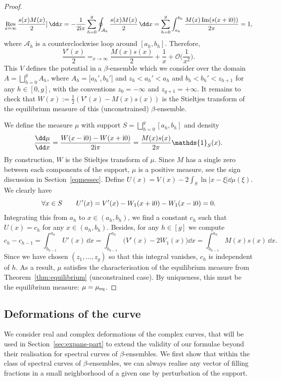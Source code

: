 \documentclass[10pt,a4paper]{amsart}
\numberwithin{equation}{section}
\newcommand{\ind}{\mathds{1}}
\begin{document}
\begin{proof}
\[
\mathop{\text{Res}}_{x = \infty} \frac{s(x)M(x)}{2}]\, \dd x = -\frac{1}{2{\rm i}\pi} \sum_{h = 0}^{g} \oint_{\mathcal{A}_h} \frac{s(x)M(x)}{2}\, \dd x = \sum_{h = 0}^{g} \int_{a_h}^{b_h} \frac{M(x) \operatorname{Im}(s(x + {\rm i}0))}{2\pi} = 1,
\]
where $\mathcal{A}_h$ is a counterclockwise loop around $[a_h,b_h]$. Therefore,
\[
\frac{V'(x)}{2} \mathop{\mathop{=}}_{x \rightarrow \infty} \frac{M(x)s(x)}{2} + \frac{1}{x} + \mathcal{O}\biggl(\frac{1}{x^2}\biggr).
\]
This $V$ defines the potential in a $\beta$-ensemble which we consider over the domain $A = \bigsqcup_{h = 0}^{g} A_h$, where $A_h = \bigl[a_h',b_h'\bigr]$ and $z_{h} < a_h' < a_h$ and $b_h < b_h' < z_{h + 1}$ for any $h \in [0,g]$, with the conventions $z_0 = -\infty$ and $z_{g + 1} = +\infty$. It remains to check that $W(x) := \frac{1}{2}(V'(x) - M(x)s(x))$ is the Stieltjes transform of the equilibrium measure of this (unconstrained) $\beta$-ensemble.



We define the measure $\mu$ with support $S = \bigsqcup_{h = 0}^{g} [a_h,b_h]$ and density
\[
\frac{\dd\mu}{\dd x} = \frac{W(x - {\rm i}0) - W(x + {\rm i}0)}{2{\rm i}\pi} = \frac{M(x)s(x)}{2\pi} \ind_S(x).
\]
By construction, $W$ is the Stieltjes transform of $\mu$. Since $M$ has a single zero between each components of the support, $\mu$ is a positive measure, see the sign discussion in Section~\ref{eqmessec}. Define $U(x) = V(x) - 2\int_{S} \ln|x - \xi|\dd \mu(\xi)$. We clearly have
\[
\forall x \in S \qquad U'(x) = V'(x) - W_1(x + {\rm i}0) - W_1(x - {\rm i}0) = 0.
\]
Integrating this from $a_{h}$ to $x \in (a_h,b_h)$, we find a constant $c_h$ such that $U(x) = c_h$ for any $x \in (a_h,b_h)$. Besides, for any $h \in [g]$ we compute
\[
c_{h} - c_{h - 1} = \int_{b_{h - 1}}^{a_h} U'(x)\, \dd x = \int_{b_{h - 1}}^{a_h}\bigl(V'(x) - 2W_1(x)\bigr)\dd x = \int_{b_{h - 1}}^{a_{h}} M(x)s(x) \,\dd x.
\]
Since we have chosen $(z_1,\ldots,z_g)$ so that this integral vanishes, $c_h$ is independent of $h$. As a result, $\mu$ satisfies the characterisation of the equilibrium measure from Theorem~\ref{thm:equilibrium} (unconstrained case). By uniqueness, this must be the equilibrium measure: $\mu = \mu_{{\rm eq}}$.
\end{proof}


\subsection{Deformations of the curve}

We consider real and complex deformations of the complex curves, that will be used in Section~\ref{sec:expans-part} to extend the validity of our formulae beyond their realisation for spectral curves of $\beta$-ensembles. We first show that within the class of spectral curves of $\beta$-ensembles, we can always realise any vector of filling fractions in a small neighborhood of a given one by perturbation of the support.
\end{document}
